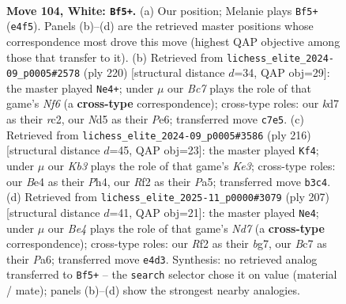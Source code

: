 \documentclass[11pt]{article}
\begin{document}
\clearpage

\begin{figure}[p]\centering
\begin{subfigure}{0.46\textwidth}\centering
\resizebox{\linewidth}{!}{%
\newchessgame
\chessboard[
  setfen={8/2Bk4/PP6/3N2rb/4B3/1K5p/5R2/8 w - - 7 104},
  showmover=false,
  pgfstyle=straightmove, color=movearrow, markmove={e4-f5}
]}
\caption{}
\end{subfigure}\hfill
\begin{subfigure}{0.46\textwidth}\centering
\resizebox{\linewidth}{!}{%
\newchessgame
\chessboard[
  setfen={r7/3B2k1/4PN2/6K1/8/2B5/2r5/8 w - - 19 111},
  showmover=false,
  pgfstyle=straightmove, color=movearrow, markmove={f6-e4}
]}
\caption{}
\end{subfigure}
\\[4pt]
\begin{subfigure}{0.46\textwidth}\centering
\resizebox{\linewidth}{!}{%
\newchessgame
\chessboard[
  setfen={8/5k2/p1b1pB2/P3P2p/7P/4K3/8/8 w - - 16 109},
  showmover=false,
  pgfstyle=straightmove, color=movearrow, markmove={e3-f4}
]}
\caption{}
\end{subfigure}\hfill
\begin{subfigure}{0.46\textwidth}\centering
\resizebox{\linewidth}{!}{%
\newchessgame
\chessboard[
  setfen={8/6B1/pK6/Pb5R/2p5/8/3n4/2k5 b - - 5 104},
  showmover=false,
  pgfstyle=straightmove, color=movearrow, markmove={d2-e4}
]}
\caption{}
\end{subfigure}
\caption{\textbf{Move 104, White: \texttt{Bf5+}.} (a) Our position; Melanie plays \texttt{Bf5+} (\texttt{e4f5}). Panels (b)--(d) are the retrieved master positions whose correspondence most drove this move (highest QAP objective among those that transfer to it). (b) Retrieved from \texttt{lichess\_elite\_2024-09\_p0005\#2578} (ply 220) [structural distance $d$=34, QAP obj=29]: the master played \texttt{Ne4+}; under $\mu$ our \emph{Bc7} plays the role of that game's \emph{Nf6} (a \textbf{cross-type} correspondence); cross-type roles: our \emph{k}d7 as their \emph{r}c2, our \emph{N}d5 as their \emph{P}e6; transferred move \texttt{c7e5}. (c) Retrieved from \texttt{lichess\_elite\_2024-09\_p0005\#3586} (ply 216) [structural distance $d$=45, QAP obj=23]: the master played \texttt{Kf4}; under $\mu$ our \emph{Kb3} plays the role of that game's \emph{Ke3}; cross-type roles: our \emph{B}e4 as their \emph{P}h4, our \emph{R}f2 as their \emph{P}a5; transferred move \texttt{b3c4}. (d) Retrieved from \texttt{lichess\_elite\_2025-11\_p0000\#3079} (ply 207) [structural distance $d$=41, QAP obj=21]: the master played \texttt{Ne4}; under $\mu$ our \emph{Be4} plays the role of that game's \emph{Nd7} (a \textbf{cross-type} correspondence); cross-type roles: our \emph{R}f2 as their \emph{b}g7, our \emph{B}c7 as their \emph{P}a6; transferred move \texttt{e4d3}. Synthesis: no retrieved analog transferred to \texttt{Bf5+} -- the \texttt{search} selector chose it on value (material / mate); panels (b)--(d) show the strongest nearby analogies.}
\label{fig:thought-m206}
\end{figure}
\end{document}
